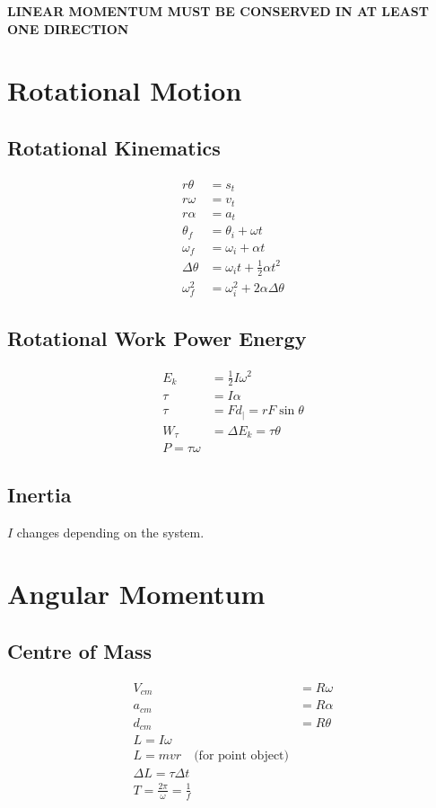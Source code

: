 \documentclass[letterpaper,10pt]{article}
\begin{document}
\begin{multicols}{2}
\medskip
\begin{center}
    \textbf{LINEAR MOMENTUM MUST BE CONSERVED IN AT LEAST ONE DIRECTION}
\end{center}

\section{Rotational Motion}
\subsection{Rotational Kinematics}
\begin{align*}
    r \theta &= s_t \\
    r \omega &= v_t \\
    r \alpha &= a_t \\
    \theta_f &= \theta_i + \omega t \\
    \omega_f &= \omega_i + \alpha t \\
    \Delta \theta &= \omega_i t + \tfrac{1}{2} \alpha t^2 \\
    \omega_f^2 &= \omega_i^2 + 2 \alpha \Delta \theta
\end{align*}

\subsection{Rotational Work Power Energy}
\begin{align*}
    E_k &= \tfrac{1}{2} I \omega^2 \\
    \tau &= I \alpha \\
    \tau &= F d_| = r F \sin \theta \\
    W_\tau &= \Delta E_k = \tau \theta \\
    P = \tau \omega
\end{align*}

\subsection{Inertia}
$I$ changes depending on the system.


\section{Angular Momentum}
\subsection{Centre of Mass}
\begin{align*}
    V_{cm} &= R \omega \\
    a_{cm} &= R \alpha \\
    d_{cm} &= R \theta \\
    L = I \omega \\
    L = mvr \quad \textrm{(for point object)} \\
    \Delta L = \tau \Delta t \\
    T = \frac{2 \pi}{\omega} = \frac{1}{f}
\end{align*}


\end{multicols}
\end{document}
